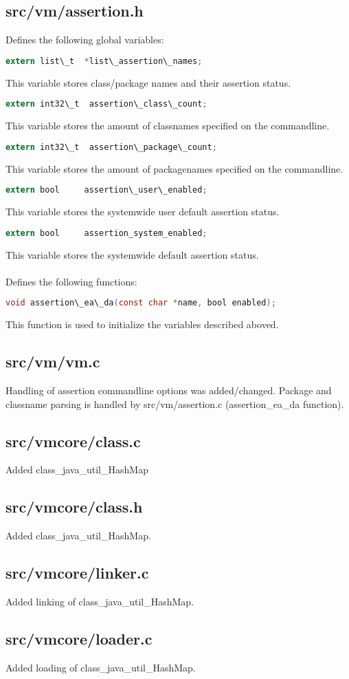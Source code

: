 \documentclass{article}%
\begin{document}
\subsection{src/vm/assertion.h}
\label{see4}
Defines the following global variables:
\begin{lstlisting}[language=C,firstnumber=46]
extern list\_t  *list\_assertion\_names;
\end{lstlisting}
This variable stores class/package names and their assertion status.
\begin{lstlisting}[language=C,firstnumber=47]
extern int32\_t  assertion\_class\_count;
\end{lstlisting}
This variable stores the amount of classnames specified on the commandline.
\begin{lstlisting}[language=C,firstnumber=48]
extern int32\_t  assertion\_package\_count;
\end{lstlisting}
This variable stores the amount of packagenames specified on the commandline.
\begin{lstlisting}[language=C,firstnumber=49]
extern bool     assertion\_user\_enabled;
\end{lstlisting}
This variable stores the systemwide user default assertion status.
\begin{lstlisting}[language=C,firstnumber=50]
extern bool     assertion_system_enabled;
\end{lstlisting}
This variable stores the systemwide default assertion status.
\\\\
Defines the following functions:
\begin{lstlisting}[language=C,firstnumber=54]
void assertion\_ea\_da(const char *name, bool enabled);
\end{lstlisting}
This function is used to initialize the variables described aboved.

\subsection{src/vm/vm.c}
Handling of assertion commandline options was added/changed. Package and classname parsing is handled by src/vm/assertion.c (assertion\_ea\_da function).

\subsection{src/vmcore/class.c}
Added class\_java\_util\_HashMap

\subsection{src/vmcore/class.h}
Added class\_java\_util\_HashMap.

\subsection{src/vmcore/linker.c}
Added linking of class\_java\_util\_HashMap.

\subsection{src/vmcore/loader.c}
Added loading of class\_java\_util\_HashMap.
\end{document}
